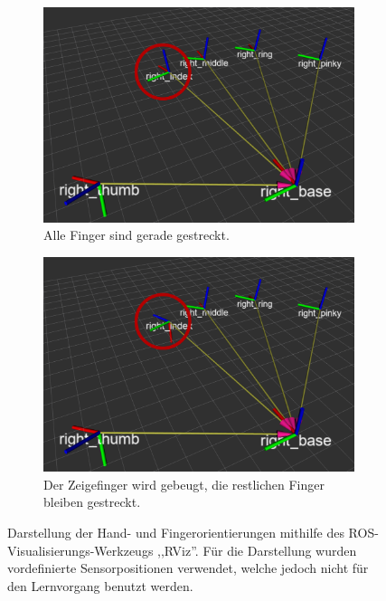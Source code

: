 
\begin{figure}
    \centering
    \begin{subfigure}[t]{0.49\textwidth}
        \includegraphics[width=\textwidth]{../common/images/rviz-idle-pose}
        \caption{Alle Finger sind gerade gestreckt.}
    \end{subfigure}
    \hfill
    \begin{subfigure}[t]{0.49\textwidth}
        \includegraphics[width=\textwidth]{../common/images/rviz-index-finger-bent}
        \caption{Der Zeigefinger wird gebeugt, die restlichen Finger bleiben gestreckt.}
    \end{subfigure}
    \caption[Darstellung der Hand- und Fingerorientierung]{Darstellung der Hand- und Fingerorientierungen mithilfe des ROS-Visualisierungs-Werkzeugs ,,RViz''. Für die Darstellung wurden vordefinierte Sensorpositionen verwendet, welche jedoch nicht für den Lernvorgang benutzt werden.}
\end{figure}

